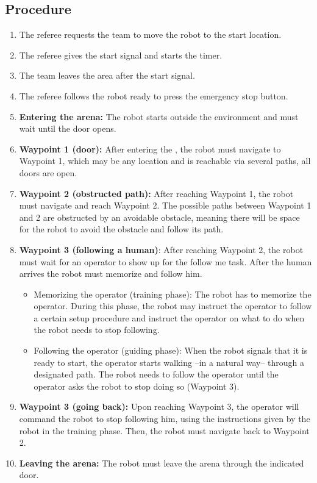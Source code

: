 \subsection*{Procedure}
	\begin{enumerate}[nosep]
		\item The referee requests the team to move the robot to the start location.
		\item The referee gives the start signal and starts the timer.
		\item The team leaves the area after the start signal.		
		\item The referee follows the robot ready to press the emergency stop button.
		
		\item \textbf{Entering the arena:} The robot starts outside the environment and must wait until the door opens.
		\item \textbf{Waypoint 1 (door):} After entering the \Arena{}, the robot must navigate to Waypoint 1, which may be any location and is reachable via several paths, all doors are open.
		\item \textbf{Waypoint 2 (obstructed path):} After reaching Waypoint 1, the robot must navigate and reach Waypoint 2. The possible paths between Waypoint 1 and 2 are obstructed by an avoidable obstacle, meaning there will be space for the robot to avoid the obstacle and follow its path. 
		\item \textbf{Waypoint 3 (following a human)}: After reaching Waypoint 2, the robot must wait for an operator to show up for the follow me task. After the human arrives the robot must memorize and follow him. 
		\begin{itemize}
		    \item Memorizing the operator (training phase): The robot has to memorize the operator. During this phase, the robot may instruct the operator to follow a certain setup procedure and instruct the operator on what to do when the robot needs to stop following. 
            \item Following the operator (guiding phase): When the robot signals that it is ready to start, the operator starts walking –in a natural way– through a designated path. The robot needs to follow the operator until the operator asks the robot to stop doing so (Waypoint 3).
		\end{itemize}
		\item \textbf{Waypoint 3 (going back):} Upon reaching Waypoint 3, the operator will command the robot to stop following him, using the instructions given by the robot in the training phase. Then, the robot must navigate back to Waypoint 2.
		\item \textbf{Leaving the arena:} The robot must leave the arena through the indicated door. 
	\end{enumerate}

